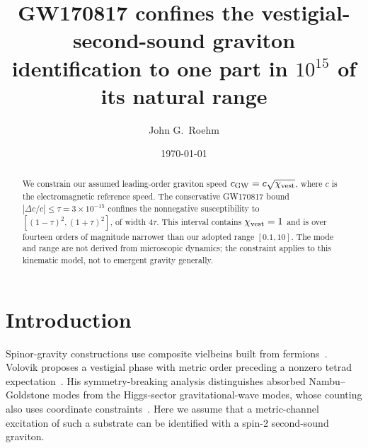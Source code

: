\documentclass[aps,prl,reprint,nofootinbib,superscriptaddress]{revtex4-2}
\newcommand{\cGW}{c_{\rm GW}}
\newcommand{\chivest}{\chi_{\rm vest}}
\newcommand{\dccap}{\Delta c/c}
\begin{document}
\title{GW170817 confines the vestigial-second-sound graviton
identification to one part in $10^{15}$ of its natural range}

\author{John G.\ Roehm}

\date{\today}

\begin{abstract}
We constrain our assumed leading-order graviton speed
$\cGW=c\sqrt{\chivest}$, where $c$ is the electromagnetic
reference speed. The conservative GW170817 bound
$|\dccap|\leq\tau=3\times10^{-15}$ confines the nonnegative
susceptibility to $[(1-\tau)^2,(1+\tau)^2]$, of width $4\tau$.
This interval contains $\chivest=1$ and is over fourteen orders of
magnitude narrower than our adopted range $[0.1,10]$.
The mode and range are not derived from microscopic dynamics;
the constraint applies to this kinematic model, not to emergent
gravity generally.
\end{abstract}

\maketitle

\section{Introduction}
\label{sec:intro}

Spinor-gravity constructions use composite vielbeins built from
fermions~\cite{Diakonov2011,HebeckerWetterich2003}.
Volovik proposes a vestigial phase with metric order preceding a
nonzero tetrad expectation~\cite{Volovik2024Vestigial}.
His symmetry-breaking analysis distinguishes absorbed
Nambu--Goldstone modes from the Higgs-sector gravitational-wave
modes, whose counting also uses coordinate
constraints~\cite{Volovik2022Counting}.
Here we assume that a metric-channel excitation of such a substrate
can be identified with a spin-2 second-sound graviton.
\end{document}
